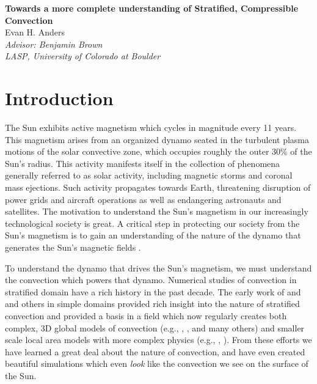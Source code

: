 \documentclass[aasms,12pt]{article}
\begin{document}
\begin{center}
   \large\textbf{Towards a more complete understanding of Stratified, Compressible Convection}\\
   \vspace{0.4cm}
   \large{Evan H. Anders}\\
   \vspace{0.4cm}
   \normalsize\textit{Advisor: Benjamin Brown}\\
   \normalsize\textit{LASP, University of Colorado at Boulder}\\
\end{center}






\section{Introduction}
The Sun exhibits active magnetism which cycles in magnitude every 11 years.
This magnetism arises from an 
organized dynamo seated in the turbulent plasma
motions of the solar convective zone, which occupies roughly the outer 30\%
of the Sun's radius. This activity manifests itself in the collection of phenomena generally
referred to as solar activity, including magnetic storms and coronal mass
ejections.  Such activity propagates towards Earth, threatening disruption of 
power grids and aircraft operations as well as endangering astronauts and satellites.
The motivation to understand the Sun's magnetism in our increasingly technological society
is great.  A critical step in protecting our society from the Sun's magnetism is 
to gain an understanding of the nature of the dynamo that generates the Sun's magnetic fields
\citep{nordlund&all2009, charbonneau2014}.

To understand the dynamo that drives the Sun's magnetism, we must understand the convection
which powers that dynamo.  Numerical studies of convection in stratified domain have a
rich history in the past decade.  The early work of \citealt{graham1975} and \citealt{hurlburt&all1984} and others in simple
domains provided rich insight into the nature of stratified convection and provided a basis
in a field which now regularly creates both complex, 3D global models of convection
(e.g., \citealt{brown&all2010}, \citealt{guerrero&all2016}, and many others)
and smaller scale local area models with more complex physics 
(e.g., \citealt{stein&nordlund2012}, \citealt{rempel2014}).
From these efforts we have learned a great deal about the nature of convection, and have
even created beautiful simulations which even \emph{look} like the convection we see on the
surface of the Sun.
\end{document}
